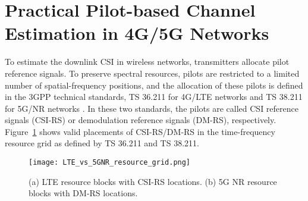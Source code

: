 \section{Practical Pilot-based Channel Estimation in 4G/5G Networks}
\label{sect:pilots}

To estimate the downlink CSI in wireless networks, transmitters allocate pilot reference signals. To preserve spectral resources, pilots are restricted to a limited number of spatial-frequency positions, and the allocation of these pilots is defined in the 3GPP technical standards, TS 36.211 for 4G/LTE networks \cite{ref:3gpp.36.211} and TS 38.211 for 5G/NR networks \cite{ref:3GPPTS38.211V15.8.0}. In these two standards, the pilots are called CSI reference signals (CSI-RS) or demodulation reference signals (DM-RS), respectively. Figure~\ref{fig:lte-vs-5g} shows valid placements of CSI-RS/DM-RS in the time-frequency resource grid as defined by TS 36.211 and TS 38.211.

\begin{figure}[!hbtp]
    \centering
    \texttt{[image: LTE\_vs\_5GNR\_resource\_grid.png]}
    \caption{(a) LTE resource blocks with CSI-RS locations. (b) 5G NR resource blocks with DM-RS locations.}
    \label{fig:lte-vs-5g}
\end{figure}

